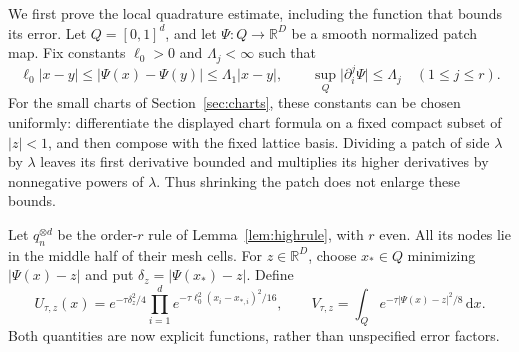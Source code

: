 \documentclass[11pt,a4paper]{article}
\theoremstyle{definition}
\newcommand{\R}{\mathbb R}
\newcommand{\dd}{\,\mathrm d}
\newcommand{\abs}[1]{\lvert#1\rvert}
\numberwithin{equation}{section}
\begin{document}
We first prove the local quadrature estimate, including the function that bounds its error. Let $Q=[0,1]^d$, and let $\Psi:Q\to\R^D$ be a smooth normalized patch map. Fix constants $\ell_0>0$ and $\Lambda_j<\infty$ such that
\begin{equation}\label{eq:normalized-chart-bounds}
 \ell_0\abs{x-y}\le\abs{\Psi(x)-\Psi(y)}\le\Lambda_1\abs{x-y},
 \qquad \sup_Q\abs{\partial_i^j\Psi}\le\Lambda_j\quad(1\le j\le r).
\end{equation}
For the small charts of Section~\ref{sec:charts}, these constants can be chosen uniformly: differentiate the displayed chart formula on a fixed compact subset of $\abs z<1$, and then compose with the fixed lattice basis. Dividing a patch of side $\lambda$ by $\lambda$ leaves its first derivative bounded and multiplies its higher derivatives by nonnegative powers of $\lambda$. Thus shrinking the patch does not enlarge these bounds.

Let $q_n^{\otimes d}$ be the order-$r$ rule of Lemma~\ref{lem:highrule}, with $r$ even. All its nodes lie in the middle half of their mesh cells. For $z\in\R^D$, choose $x_*\in Q$ minimizing $\abs{\Psi(x)-z}$ and put $\delta_z=\abs{\Psi(x_*)-z}$. Define
\begin{equation}\label{eq:explicit-envelope}
 U_{\tau,z}(x)=e^{-\tau\delta_z^2/4}
       \prod_{i=1}^d e^{-\tau\ell_0^2(x_i-x_{*,i})^2/16},
 \qquad
 V_{\tau,z}=\int_Q e^{-\tau\abs{\Psi(x)-z}^2/8}\dd x.
\end{equation}
Both quantities are now explicit functions, rather than unspecified error factors.
\end{document}
